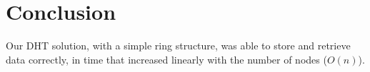 \documentclass[11pt,conference]{IEEEtran}
\begin{document}
\section{Conclusion}

Our DHT solution, with a simple ring structure, was able to store and retrieve
data correctly, in time that increased linearly with the number of nodes
($O(n)$).




\end{document}
